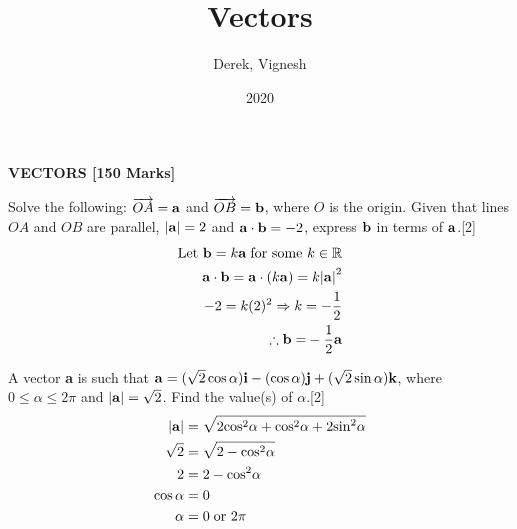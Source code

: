 \documentclass[12pt, a4 paper]{article}
\title{Vectors}
\author{Derek, Vignesh}
\date{2020}
\begin{document}
\maketitle
\textbf{VECTORS [150 Marks]}
\begin{outline}[enumerate]
	\1 Solve the following:
	\2 $\overrightarrow {OA}  = {\bf{a}}$ and $\overrightarrow {OB}  = {\bf{b}}$, where $O$ is the origin. Given that lines $OA$ and $OB$ are parallel, $\left| {\bf{a}} \right| = 2$ and ${\bf{a}} \cdot {\bf{b}} =  - 2$, express $\bf{b}$ in terms of $\bf{a}$.\hfill[2]
	\color{blue}
	\begin{align*}
		\textrm{Let } {\bf{b}} = k{\bf{a}}\;{\textrm{for some }}k \in \mathbb{R}            \\
		{\bf{a}} \cdot {\bf{b}} = {\bf{a}} \cdot (k{\bf{a}}) = k{\left| {\bf{a}} \right|^2} \\
		- 2 = k{(2)^2} \Rightarrow k =  - \frac{1}{2}                                       \\
		\therefore {\bf{b = }} - \frac{1}{2}{\bf{a}}                                        
	\end{align*}
							        
	\color{black}
	\2 A vector \textbf{a} is such that ${\bf{a}} = (\sqrt 2 \cos \alpha ){\bf{i}} - (\cos \alpha ){\bf{j}} + (\sqrt 2 \sin \alpha ){\bf{k}}$, where $0 \le \alpha  \le 2\pi $ and $\left| {\bf{a}} \right| = \sqrt 2 $. Find the value(s) of $\alpha $.\hfill[2]
	\color{blue}
	\begin{align*}
		\left| {\bf{a}} \right| & = \sqrt {2{{\cos }^2}\alpha  + {{\cos }^2}\alpha  + 2{{\sin }^2}\alpha } \\
		\sqrt 2                 & = \sqrt {2 - {{\cos }^2}\alpha }                                         \\
		2                       & = 2 - {\cos ^2}\alpha                                                    \\
		\cos \alpha             & = 0                                                                      \\
		\alpha                  & = 0\;{\textrm{or }}2\pi                                                  
	\end{align*}
							        

\end{outline}
\end{document}
